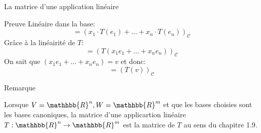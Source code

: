 \begin{parag}{La matrice d'une application linéaire}
\begin{subparag}{Preuve}
        Linéaire dans la base:
        \[= \left(x_1\cdot T\left(e_1\right) + \dots + x_n \cdot T\left(e_n\right)\right)_{\mathcal{C}}\]
        Grâce à la linéairité de $T$:
        \[= \left(T\left(x_1 e_1 + \dots + x_n e_n \right) \right)_{\mathcal{C}}\]
        On sait que $\left(x_1 e_1 + \dots + x_n e_n \right)  = v$ et donc:
\[ = \left(T\left(v\right)\right)_{\mathcal{C}}\]
    \end{subparag}
    \begin{subparag}{Remarque}
    \begin{framedremark}
        Lorsque $V = \mathhbb{R}^n, W = \mathhbb{R}^m$ et que les bases choisies sont les bases canoniques, la matrice d'une applicartion linéaire $T : \mathhbb{R}^n \to \mathhbb{R}^m$ est la matrice de $T$ au sens du chapitre 1.9.
    \end{framedremark}
        
    \end{subparag}


\end{parag}

